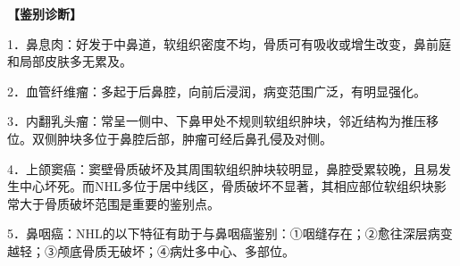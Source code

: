 \textbf{【鉴别诊断】}

1．鼻息肉：好发于中鼻道，软组织密度不均，骨质可有吸收或增生改变，鼻前庭和局部皮肤多无累及。

2．血管纤维瘤：多起于后鼻腔，向前后浸润，病变范围广泛，有明显强化。

3．内翻乳头瘤：常呈一侧中、下鼻甲处不规则软组织肿块，邻近结构为推压移位。双侧肿块多位于鼻腔后部，肿瘤可经后鼻孔侵及对侧。

4．上颌窦癌：窦壁骨质破坏及其周围软组织肿块较明显，鼻腔受累较晚，且易发生中心坏死。而NHL多位于居中线区，骨质破坏不显著，其相应部位软组织块影常大于骨质破坏范围是重要的鉴别点。

5．鼻咽癌：NHL的以下特征有助于与鼻咽癌鉴别：①咽缝存在；②愈往深层病变越轻；③颅底骨质无破坏；④病灶多中心、多部位。

\protect\hypertarget{text00013.html}{}{}

